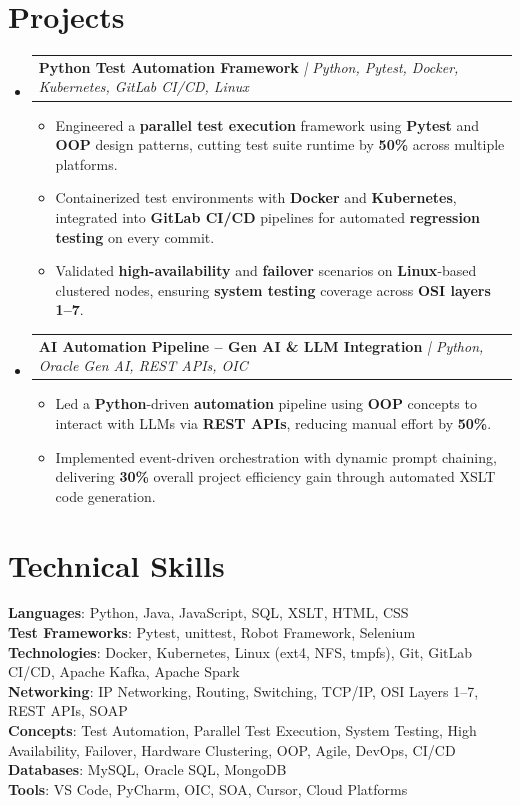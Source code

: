 \documentclass[letterpaper,11pt]{article}
\makeatletter
\newcommand{\resumeItem}[1]{
  \item\small{
    {#1 \vspace{-2pt}}
  }
}
\newcommand{\resumeProjectHeading}[2]{
    \item
    \begin{tabular*}{0.97\textwidth}{l@{\extracolsep{\fill}}r}
      \small#1 & #2 \\
    \end{tabular*}\vspace{-7pt}
}
\newcommand{\resumeSubHeadingListStart}{\begin{itemize}[leftmargin=0.15in, label={}]}
\newcommand{\resumeSubHeadingListEnd}{\end{itemize}}
\newcommand{\resumeItemListStart}{\begin{itemize}}
\newcommand{\resumeItemListEnd}{\end{itemize}\vspace{-5pt}}
\makeatother
\begin{document}
\section{Projects}
\resumeSubHeadingListStart
    \resumeProjectHeading
        {\textbf{Python Test Automation Framework} \textit{| Python, Pytest, Docker, Kubernetes, GitLab CI/CD, Linux}}{}
    \resumeItemListStart
        \resumeItem{Engineered a \textbf{parallel test execution} framework using \textbf{Pytest} and \textbf{OOP} design patterns, cutting test suite runtime by \textbf{50\%} across multiple platforms.}
        \resumeItem{Containerized test environments with \textbf{Docker} and \textbf{Kubernetes}, integrated into \textbf{GitLab CI/CD} pipelines for automated \textbf{regression testing} on every commit.}
        \resumeItem{Validated \textbf{high-availability} and \textbf{failover} scenarios on \textbf{Linux}-based clustered nodes, ensuring \textbf{system testing} coverage across \textbf{OSI layers 1--7}.}
    \resumeItemListEnd
    \resumeProjectHeading
        {\textbf{AI Automation Pipeline -- Gen AI \& LLM Integration} \textit{| Python, Oracle Gen AI, REST APIs, OIC}}{}
    \resumeItemListStart
        \resumeItem{Led a \textbf{Python}-driven \textbf{automation} pipeline using \textbf{OOP} concepts to interact with LLMs via \textbf{REST APIs}, reducing manual effort by \textbf{50\%}.}
        \resumeItem{Implemented event-driven orchestration with dynamic prompt chaining, delivering \textbf{30\%} overall project efficiency gain through automated XSLT code generation.}
    \resumeItemListEnd
\resumeSubHeadingListEnd

\section{Technical Skills}
\begin{itemize}[leftmargin=0.15in, label={}]
    \small{\item{
        \textbf{Languages}{: Python, Java, JavaScript, SQL, XSLT, HTML, CSS} \\
        \textbf{Test Frameworks}{: Pytest, unittest, Robot Framework, Selenium} \\
        \textbf{Technologies}{: Docker, Kubernetes, Linux (ext4, NFS, tmpfs), Git, GitLab CI/CD, Apache Kafka, Apache Spark} \\
        \textbf{Networking}{: IP Networking, Routing, Switching, TCP/IP, OSI Layers 1--7, REST APIs, SOAP} \\
        \textbf{Concepts}{: Test Automation, Parallel Test Execution, System Testing, High Availability, Failover, Hardware Clustering, OOP, Agile, DevOps, CI/CD} \\
        \textbf{Databases}{: MySQL, Oracle SQL, MongoDB} \\
        \textbf{Tools}{: VS Code, PyCharm, OIC, SOA, Cursor, Cloud Platforms}
    }}
\end{itemize}
\end{document}
